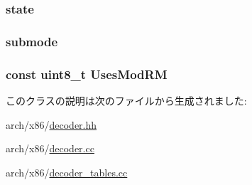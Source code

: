\label{classX86ISA_1_1Decoder_aef01e995775f4a7ba2367414f311dc73}
\hypertarget{classX86ISA_1_1Decoder_a876b486d3a5241a126bd5751c5f70f79}{
\subsubsection[{state}]{ {\bf state}}}
\label{classX86ISA_1_1Decoder_a876b486d3a5241a126bd5751c5f70f79}
\hypertarget{classX86ISA_1_1Decoder_a476c8dbd8e30b9067e6c2f0b7274be73}{
\subsubsection[{submode}]{ {\bf submode}}}
\label{classX86ISA_1_1Decoder_a476c8dbd8e30b9067e6c2f0b7274be73}
\hypertarget{classX86ISA_1_1Decoder_a6e9f1359a8e815c5bdd0efc306f5bf32}{
\subsubsection[{UsesModRM}]{\setlength{\rightskip}{0pt plus 5cm}const uint8\_\-t {\bf UsesModRM}}}
\label{classX86ISA_1_1Decoder_a6e9f1359a8e815c5bdd0efc306f5bf32}


このクラスの説明は次のファイルから生成されました:\begin{DoxyCompactItemize}
\item 
arch/x86/\hyperlink{x86_2decoder_8hh}{decoder.hh}\item 
arch/x86/\hyperlink{x86_2decoder_8cc}{decoder.cc}\item 
arch/x86/\hyperlink{decoder__tables_8cc}{decoder\_\-tables.cc}\end{DoxyCompactItemize}
